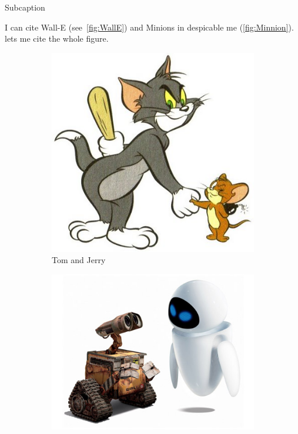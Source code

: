 \documentclass[10pt,times]{beamer}
\begin{document}
\begin{frame}[fragile]{Subcaption}

I can cite Wall-E (see~\cref{fig:WallE}) and Minions in despicable me 
(\cref{fig:Minnion}).~ lets me cite the whole figure.

\begin{exampletwouptiny}
\begin{figure}
  \centering
  \begin{subfigure}[b]{0.3\textwidth}
    \includegraphics[width=\textwidth]
			    {figs/TomandJerry}
    \caption{Tom and Jerry}
    \label{fig:TomJerry}   
  \end{subfigure}             
  \begin{subfigure}[b]{0.3\textwidth}
    \includegraphics[width=\textwidth]{figs/WallE}

\end{subfigure}
\end{figure}
\end{exampletwouptiny}
\end{frame}
\end{document}
